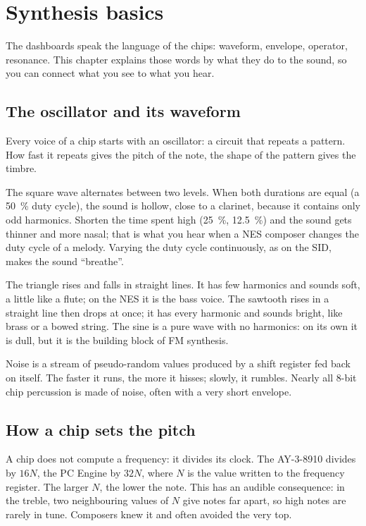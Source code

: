 \chapter{Synthesis basics}\label{chap:synthese}
The dashboards speak the language of the chips: waveform, envelope, operator, resonance. This chapter explains
those words by what they do to the sound, so you can connect what you see to what you hear.

\section{The oscillator and its waveform}
Every voice of a chip starts with an oscillator: a circuit that repeats a pattern. How fast it repeats gives the
pitch of the note, the shape of the pattern gives the timbre.

The square wave alternates between two levels. When both durations are equal (a 50~\% duty cycle), the sound is
hollow, close to a clarinet, because it contains only odd harmonics. Shorten the time spent high (25~\%, 12.5~\%)
and the sound gets thinner and more nasal; that is what you hear when a NES composer changes the duty cycle of a
melody. Varying the duty cycle continuously, as on the SID, makes the sound ``breathe''.

The triangle rises and falls in straight lines. It has few harmonics and sounds soft, a little like a flute; on the
NES it is the bass voice. The sawtooth rises in a straight line then drops at once; it has every harmonic and sounds
bright, like brass or a bowed string. The sine is a pure wave with no harmonics: on its own it is dull, but it is
the building block of FM synthesis.

Noise is a stream of pseudo-random values produced by a shift register fed back on itself. The faster it runs, the
more it hisses; slowly, it rumbles. Nearly all 8-bit chip percussion is made of noise, often with a very short
envelope.

\section{How a chip sets the pitch}
A chip does not compute a frequency: it divides its clock. The AY-3-8910 divides by $16N$, the PC Engine by $32N$,
where $N$ is the value written to the frequency register. The larger $N$, the lower the note. This has an audible
consequence: in the treble, two neighbouring values of $N$ give notes far apart, so high notes are rarely in tune.
Composers knew it and often avoided the very top.

